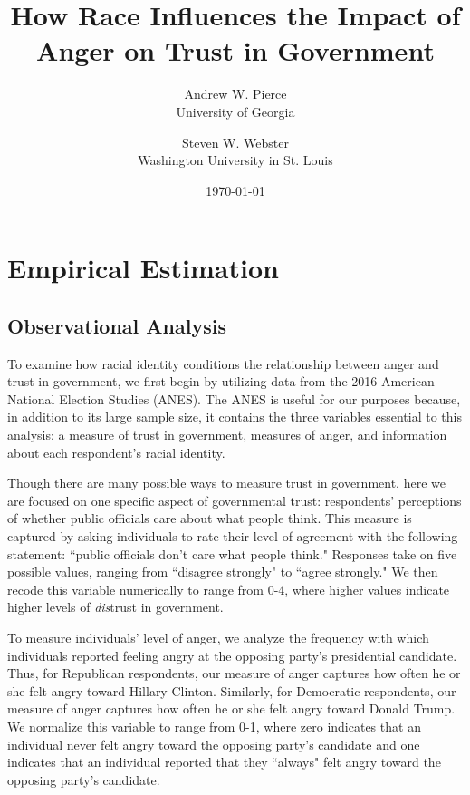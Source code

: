 \documentclass[12pt, letterpaper]{article}
\author{Andrew W. Pierce \\ University of Georgia \and Steven W. Webster \\ Washington University in St. Louis}
\title{How Race Influences the Impact of Anger on Trust in Government}
\date{\today}
\begin{document}
%

\begin{titlepage}
\maketitle

\thispagestyle{empty}

\begin{singlespacing}
\end{singlespacing}

\end{titlepage}


\newpage
\setcounter{page}{1}

\doublespacing

\section{Empirical Estimation}
\label{sec:design}

\subsection{Observational Analysis}
\label{subsec:anes}

To examine how racial identity conditions the relationship between anger and trust in government, we first begin by utilizing data from the 2016 American National Election Studies (ANES). The ANES is useful for our purposes because, in addition to its large sample size, it contains the three variables essential to this analysis: a measure of trust in government, measures of anger, and information about each respondent's racial identity.

Though there are many possible ways to measure trust in government, here we are focused on one specific aspect of governmental trust: respondents' perceptions of whether public officials care about what people think. This measure is captured by asking individuals to rate their level of agreement with the following statement: ``public officials don't care what people think." Responses take on five possible values, ranging from ``disagree strongly" to ``agree strongly." We then recode this variable numerically to range from 0-4, where higher values indicate higher levels of \emph{dis}trust in government.

To measure individuals' level of anger, we analyze the frequency with which individuals reported feeling angry at the opposing party's presidential candidate. Thus, for Republican respondents, our measure of anger captures how often he or she felt angry toward Hillary Clinton. Similarly, for Democratic respondents, our measure of anger captures how often he or she felt angry toward Donald Trump. We normalize this variable to range from 0-1, where zero indicates that an individual never felt angry toward the opposing party's candidate and one indicates that an individual reported that they ``always" felt angry toward the opposing party's candidate. 
\end{document}
